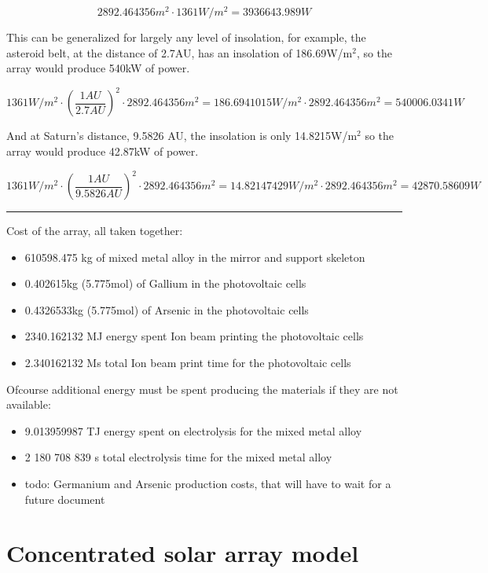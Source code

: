 \documentclass[a4paper]{article}
\begin{document}
	$$ 2892.464356 m^2 \cdot 1361W/m^2 = 3936643.989 W $$
	
	This can be generalized for largely any level of insolation, for example, the asteroid belt, at the distance of 2.7AU, has an insolation of 186.69W/m$^2$, so the array would produce 540kW of power.
	
	$$ 1361W/m^2 \cdot (\frac{1AU}{2.7AU})^2 \cdot 2892.464356 m^2 = 186.6941015 W/m^2 \cdot 2892.464356 m^2 = 540006.0341 W $$
	
	And at Saturn's distance, 9.5826 AU, the insolation is only 14.8215W/m$^2$ so the array would produce 42.87kW of power.
	
	$$ 1361W/m^2 \cdot (\frac{1AU}{9.5826AU})^2 \cdot 2892.464356 m^2 = 14.82147429 W/m^2 \cdot 2892.464356 m^2 = 42870.58609 W $$
	
	\rule{\linewidth}{0.5pt}
	
	Cost of the array, all taken together:
	
	\begin{itemize}
		\item 610598.475 kg of mixed metal alloy in the mirror and support skeleton
		\item 0.402615kg (5.775mol) of Gallium in the photovoltaic cells
		\item 0.4326533kg (5.775mol) of Arsenic in the photovoltaic cells
		\item 2340.162132 MJ energy spent Ion beam printing the photovoltaic cells
		\item 2.340162132 Ms total Ion beam print time for the photovoltaic cells
	\end{itemize}
	
	Ofcourse additional energy must be spent producing the materials if they are not available:
	
	\begin{itemize}
		\item 9.013959987 TJ energy spent on electrolysis for the mixed metal alloy
		
		\item 2 180 708 839 s total electrolysis time for the mixed metal alloy
		
		\item todo: Germanium and Arsenic production costs, that will have to wait for a future document
	\end{itemize}
	
	\pagebreak
	
	\section{Concentrated solar array model}
	
\end{document}
